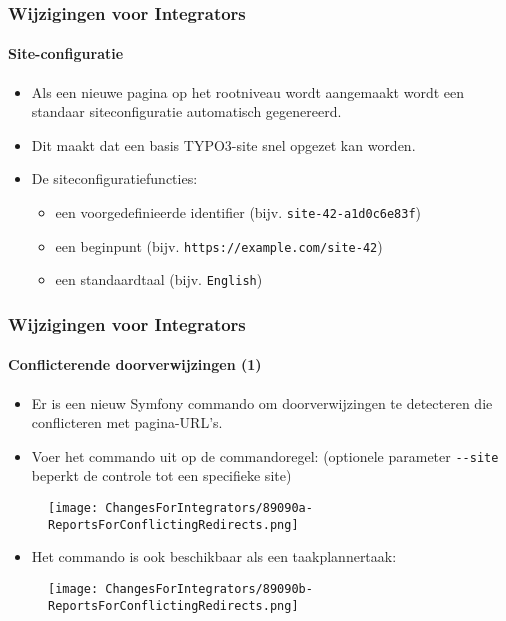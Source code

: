 
\begin{frame}[fragile]
	\frametitle{Wijzigingen voor Integrators}
	\framesubtitle{Site-configuratie}

	\begin{itemize}
		\item Als een nieuwe pagina op het rootniveau wordt aangemaakt wordt een
			standaar siteconfiguratie automatisch gegenereerd.
		\item Dit maakt dat een basis TYPO3-site snel opgezet kan worden.
		\item De siteconfiguratiefuncties:

			\begin{itemize}
				\item een voorgedefinieerde identifier (bijv. \texttt{site-42-a1d0c6e83f})
				\item een beginpunt (bijv. \texttt{https://example.com/site-42})
				\item een standaardtaal (bijv. \texttt{English})
			\end{itemize}

	\end{itemize}

\end{frame}


\begin{frame}[fragile]
	\frametitle{Wijzigingen voor Integrators}
	\framesubtitle{Conflicterende doorverwijzingen (1)}

	\begin{itemize}
		\item Er is een nieuw Symfony commando om doorverwijzingen te detecteren
			die conflicteren met pagina-URL's.
		\item Voer het commando uit op de commandoregel:\newline
			\smaller
				(optionele parameter \texttt{-}\texttt{-site} beperkt de controle tot een specifieke site)
			\normalsize
	\end{itemize}

	\begin{figure}
		\texttt{[image: ChangesForIntegrators/89090a-ReportsForConflictingRedirects.png]}
	\end{figure}

	\begin{itemize}
		\item Het commando is ook beschikbaar als een taakplannertaak:
	\end{itemize}

	\begin{figure}
		\texttt{[image: ChangesForIntegrators/89090b-ReportsForConflictingRedirects.png]}
	\end{figure}

\end{frame}

